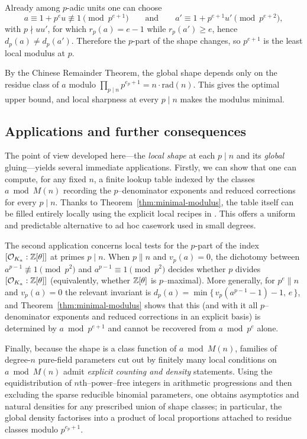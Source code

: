 \documentclass[12pt,a4paper,oneside]{amsart}
\theoremstyle{definition}
\begin{document}
Already among $p$-adic units one can choose
\[
a\equiv 1+p^{e}u\not\equiv 1\pmod{p^{e+1}}
\qquad\text{and}\qquad
a'\equiv 1+p^{e+1}u'\pmod{p^{e+2}},
\]
with $p\nmid uu'$, for which $r_p(a)=e-1$ while $r_p(a')\ge e$, hence $d_p(a)\ne d_p(a')$. Therefore the
$p$-part of the shape changes, so $p^{e+1}$ is the least local modulus at $p$.

By the Chinese Remainder Theorem, the global shape depends only on the residue class of $a$ modulo $\prod_{p\mid n}p^{e_p+1}=n\cdot\mathrm{rad}(n)$. This gives the optimal upper bound, and local sharpness at every $p\mid n$ makes the modulus minimal.


\subsection*{Applications and further consequences}

The point of view developed here---the \emph{local shape} at each \(p\mid n\) and its \emph{global} gluing---yields several immediate applications. Firstly, we can show that one can compute, for any fixed \(n\), a finite lookup table indexed by the classes \(a\bmod M(n)\) recording the \(p\)–denominator exponents and reduced corrections for every \(p\mid n\). Thanks to Theorem~\ref{thm:minimal-modulus}, the table itself can be filled entirely locally using the explicit local recipes in \cite{JKS21}. This offers a uniform and predictable alternative to ad hoc casework used in small degrees.

The second application concerns local tests for the $p$-part of the index
$[\mathcal O_{K_a}:\Bbb Z[\theta]]$ at primes $p\mid n$. When $p\parallel n$ and $v_p(a)=0$, the dichotomy between $a^{p-1}\not\equiv 1\pmod{p^2}$ and $a^{p-1}\equiv 1\pmod{p^2}$ decides whether $p$ divides $[\mathcal O_{K_a}:\Bbb Z[\theta]]$ (equivalently, whether $\Bbb Z[\theta]$ is $p$--maximal). More generally, for $p^e\parallel n$ and $v_p(a)=0$ the relevant invariant is $d_p(a)=\min\{\,v_p(a^{p-1}-1)-1,\,e\,\}$, and Theorem~\ref{thm:minimal-modulus} shows that this (and with it all $p$--denominator exponents and reduced corrections in an explicit basis) is determined by $a\bmod p^{e+1}$ and cannot be recovered from $a\bmod p^e$ alone.


Finally, because the shape is a class function of \(a\bmod M(n)\), families of degree-$n$ pure-field parameters cut out by finitely many local conditions on \(a\bmod M(n)\) admit \emph{explicit counting and density} statements. Using the equidistribution of \(n\)th–power–free integers in arithmetic progressions and then excluding the sparse reducible binomial parameters, one obtains asymptotics and natural densities for any prescribed union of shape classes; in particular, the global density factorises into a product of local proportions attached to residue classes modulo \(p^{e_p+1}\).
\end{document}
